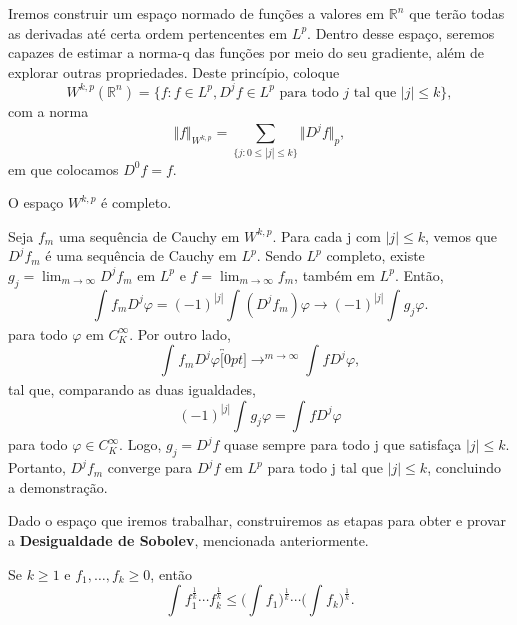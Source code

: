 \documentclass[measure_theory.tex]{subfiles}
\begin{document}
Iremos construir um espaço normado de funções a valores em \(\mathbb{R}^{n}\) que terão todas as derivadas até certa ordem pertencentes em \(L^{p}\). Dentro desse espaço, seremos capazes de estimar a norma-q das funções por meio do seu gradiente, além de explorar outras propriedades. Deste princípio, coloque
\[
	W^{k, p}(\mathbb{R}^{n})=\{f: f\in L^{p}, D^{j}f\in L^{p} \text{ para todo }j\text{ tal que }|j|\leq k\},
\]
com a norma
\[
	\Vert f \Vert_{W^{k, p}}=\sum\limits_{\{j:0\leq |j|\leq k\}}^{}\Vert D^{j}f \Vert_{p},
\]
em que colocamos \(D^{0}f=f.\)
\begin{theorem*}
	O espaço \(W^{k, p}\) é completo.
\end{theorem*}
\begin{proof*}
	Seja \(f_{m}\) uma sequência de Cauchy em \(W^{k, p}\). Para cada j com \(|j|\leq k\), vemos que \(D^{j}f_{m}\) é uma sequência de Cauchy em \(L^{p}\). Sendo \(L^{p}\) completo, existe \(g_{j}=\lim_{m\to \infty}D^{j}f_{m}\) em \(L^{p}\) e \(f=\lim_{m\to \infty}f_{m}\), também em \(L^{p}\). Então,
	\[
		\int_{}^{}f_{m}D^{j}\varphi =(-1)^{|j|}\int_{}^{}(D^{j}f_{m})\varphi \longrightarrow (-1)^{|j|}\int_{}^{}g_{j}\varphi.
	\]
	para todo \(\varphi \) em \(C_{K}^{\infty}\). Por outro lado,
	\[
		\int_{}^{}f_{m}D^{j}\varphi \overbracket[0pt]{\longrightarrow}^{m\to \infty}\int_{}^{}f D^{j}\varphi,
	\]
	tal que, comparando as duas igualdades,
	\[
		(-1)^{|j|}\int_{}^{}g_{j}\varphi = \int_{}^{}fD^{j}\varphi
	\]
	para todo \(\varphi \in C_{K}^{\infty}.\) Logo, \(g_{j}=D^{j}f\) quase sempre para todo j que satisfaça \(|j|\leq k.\) Portanto, \(D^{j}f_{m}\) converge para \(D^{j}f\) em \(L^{p}\) para todo j tal que \(|j|\leq k\), concluindo a demonstração. \qedsymbol
\end{proof*}
Dado o espaço que iremos trabalhar, construiremos as etapas para obter e provar a \textbf{Desigualdade de Sobolev}, mencionada anteriormente.
\begin{lemma*}
	Se \(k\geq 1\) e \(f_{1},\dotsc , f_{k}\geq 0\), então
	\[
		\int_{}^{}f_{1}^{\frac{1}{k}}\cdots f_{k}^{\frac{1}{k}}\leq \biggl(\int_{}^{}f_{1}\biggr)^{\frac{1}{k}}\cdots \biggl(\int_{}^{}f_{k}\biggr)^{\frac{1}{k}}.
	\]
\end{lemma*}
\end{document}
